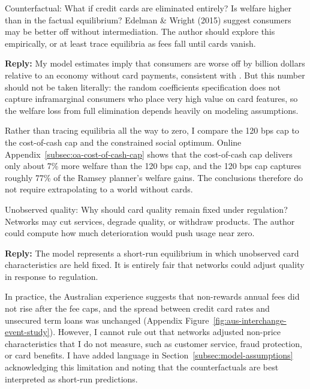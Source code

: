 \documentclass[main.tex]{subfiles}
\begin{document}
\begin{refsection}
\begin{refcommentnoclear}
Counterfactual: What if credit cards are eliminated entirely?
Is welfare higher than in the factual equilibrium?
Edelman \& Wright (2015) suggest consumers may be better off without intermediation.
The author should explore this empirically, or at least trace equilibria as fees fall until cards vanish.
\end{refcommentnoclear}

\textbf{Reply:} My model estimates imply that consumers are worse off by  billion dollars relative to an economy without card payments, consistent with \textcite{Edelman.Wright2015}.
But this number should not be taken literally: the random coefficients specification does not capture inframarginal consumers who place very high value on card features, so the welfare loss from full elimination depends heavily on modeling assumptions.

Rather than tracing equilibria all the way to zero, I compare the 120 bps cap to the cost-of-cash cap and the constrained social optimum.
Online Appendix~\ref{subsec:oa-cost-of-cash-cap} shows that the cost-of-cash cap delivers only about 7\% more welfare than the 120 bps cap, and the 120 bps cap captures roughly 77\% of the Ramsey planner's welfare gains.
The conclusions therefore do not require extrapolating to a world without cards.

\begin{refcommentnoclear}
Unobserved quality: Why should card quality remain fixed under regulation?
Networks may cut services, degrade quality, or withdraw products.
The author could compute how much deterioration would push usage near zero.

\end{refcommentnoclear}

\textbf{Reply:} The model represents a short-run equilibrium in which unobserved card characteristics are held fixed.
It is entirely fair that networks could adjust quality in response to regulation.

In practice, the Australian experience suggests that non-rewards annual fees did not rise after the fee caps, and the spread between credit card rates and unsecured term loans was unchanged (Appendix Figure~\ref{fig:aus-interchange-event-study}).
However, I cannot rule out that networks adjusted non-price characteristics that I do not measure, such as customer service, fraud protection, or card benefits.
I have added language in Section~\ref{subsec:model-assumptions} acknowledging this limitation and noting that the counterfactuals are best interpreted as short-run predictions.


\end{refsection}
\end{document}
